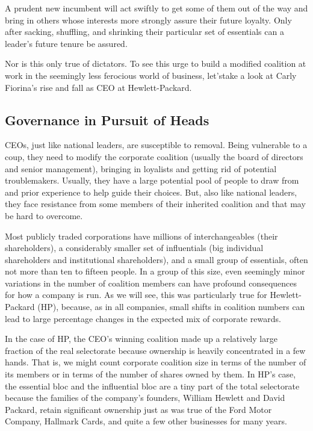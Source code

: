 \documentclass[10pt]{article}
\begin{document}
{\large A prudent new incumbent will act swiftly to get some of them out of the
way and bring in others whose interests more strongly assure their future
loyalty. Only after sacking, shuffling, and shrinking their particular set of
essentials can a leader's future tenure be assured.}

{\large Nor is this only true of dictators. To see this urge to build a modified
coalition at work in the seemingly less ferocious world of business, let'stake a
look at Carly Fiorina's rise and fall as CEO at Hewlett-Packard.}

\subsection{Governance in Pursuit of Heads}

{\large CEOs, just like national leaders, are susceptible to removal. Being
vulnerable to a coup, they need to modify the corporate coalition (usually the
board of directors and senior management), bringing in loyalists and getting rid
of potential troublemakers. Usually, they have a large potential pool of people
to draw from and prior experience to help guide their choices. But, also like
national leaders, they face resistance from some members of their inherited
coalition and that may be hard to overcome.}

{\large Most publicly traded corporations have millions of interchangeables
(their shareholders), a considerably smaller set of influentials (big individual
shareholders and institutional shareholders), and a small group of essentials,
often not more than ten to fifteen people. In a group of this size, even
seemingly minor variations in the number of coalition members can have profound
consequences for how a company is run. As we will see, this was particularly true
for Hewlett-Packard (HP), because, as in all companies, small shifts in coalition
numbers can lead to large percentage changes in the expected mix of corporate
rewards.}

{\large In the case of HP, the CEO's winning coalition made up a relatively
large fraction of the real selectorate because ownership is heavily concentrated
in a few hands. That is, we might count corporate coalition size in terms of the
number of its members or in terms of the number of shares owned by them. In HP's
case, the essential bloc and the influential bloc are a tiny part of the total
selectorate because the families of the company's founders, William Hewlett and
David Packard, retain significant ownership just as was true of the Ford Motor
Company, Hallmark Cards, and quite a few other businesses for many years.}
\end{document}

